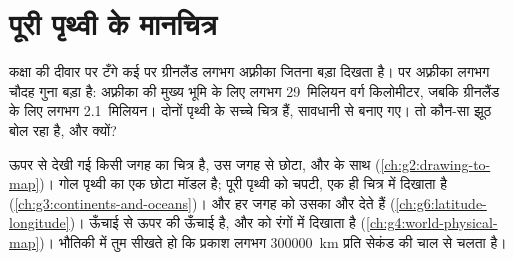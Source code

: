 \chapter{पूरी पृथ्वी के मानचित्र}\label{ch:g9:maps-of-the-earth}

कक्षा की दीवार पर टँगे कई  पर ग्रीनलैंड लगभग अफ़्रीका जितना बड़ा दिखता है।  पर
अफ़्रीका लगभग चौदह गुना बड़ा है: अफ़्रीका की मुख्य भूमि के लिए लगभग 29~मिलियन वर्ग किलोमीटर,
जबकि ग्रीनलैंड के लिए लगभग 2.1~मिलियन। दोनों पृथ्वी के सच्चे चित्र हैं, सावधानी से बनाए
गए। तो कौन-सा झूठ बोल रहा है, और क्यों?

\begin{recall}
 ऊपर से देखी गई किसी जगह का चित्र है, उस जगह से छोटा,  और  के साथ
(\cref{ch:g2:drawing-to-map})।  गोल पृथ्वी का एक छोटा मॉडल है;  पूरी
पृथ्वी को चपटी, एक ही चित्र में दिखाता है (\cref{ch:g3:continents-and-oceans})।  और  हर जगह को उसका  और  देते हैं
(\cref{ch:g6:latitude-longitude})। ऊँचाई  से ऊपर की ऊँचाई है, और 
 को रंगों में दिखाता है (\cref{ch:g4:world-physical-map})। भौतिकी में तुम सीखते हो
कि प्रकाश लगभग \qty{300000}{km} प्रति सेकंड की चाल से चलता
है।
\end{recall}

